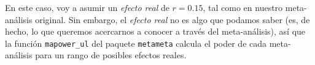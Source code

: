 \documentclass[
  bookmarksnumbered]{article}
\newenvironment{Shaded}{\begin{snugshade}}{\end{snugshade}}
\newcommand{\AttributeTok}[1]{\textcolor[rgb]{0.00,0.34,0.68}{#1}}
\newcommand{\FloatTok}[1]{\textcolor[rgb]{0.69,0.50,0.00}{#1}}
\newcommand{\FunctionTok}[1]{\textcolor[rgb]{0.39,0.29,0.61}{#1}}
\newcommand{\NormalTok}[1]{\textcolor[rgb]{0.12,0.11,0.11}{#1}}
\newcommand{\OtherTok}[1]{\textcolor[rgb]{0.00,0.43,0.16}{#1}}
\newcommand{\SpecialCharTok}[1]{\textcolor[rgb]{0.24,0.68,0.91}{#1}}
\newcommand{\StringTok}[1]{\textcolor[rgb]{0.75,0.01,0.01}{#1}}
\begin{document}
En este caso, voy a asumir un \emph{efecto real} de \(r = 0.15\), tal como en nuestro meta-análisis original. Sin embargo, el \emph{efecto real} no es algo que podamos saber (es, de hecho, lo que queremos acercarnos a conocer a través del meta-análisis), así que la función \texttt{mapower\_ul} del paquete \texttt{metameta} calcula el poder de cada meta-análisis para un rango de posibles efectos reales.

\begin{Shaded}
\end{Shaded}
\end{document}
